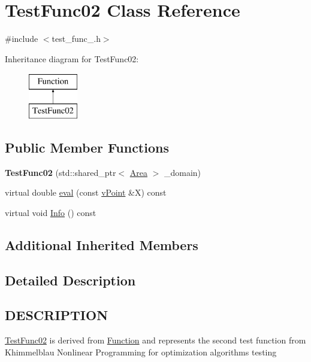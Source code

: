 \hypertarget{class_test_func02}{}\section{Test\+Func02 Class Reference}
\label{class_test_func02}


{\ttfamily \#include $<$test\+\_\+func\+\_.\+h$>$}

Inheritance diagram for Test\+Func02\+:\begin{figure}[H]
\begin{center}
\leavevmode
\includegraphics[height=2.000000cm]{class_test_func02}
\end{center}
\end{figure}
\subsection*{Public Member Functions}
\begin{DoxyCompactItemize}
\item 
\mbox{\label{class_test_func02_aeb12e0d6d3c926c2074247773e44f894}} 
{\bfseries Test\+Func02} (std\+::shared\+\_\+ptr$<$ \hyperlink{class_area}{Area} $>$ \+\_\+domain)
\item 
virtual double \hyperlink{class_test_func02_af4cbebcbe8a7bd282f48ae7053c044b0}{eval} (const \hyperlink{classv_point}{v\+Point} \&X) const
\item 
virtual void \hyperlink{class_test_func02_abb39a10959e945371e662db3cd9d86ce}{Info} () const
\end{DoxyCompactItemize}
\subsection*{Additional Inherited Members}


\subsection{Detailed Description}
\hypertarget{function_8h_DESCRIPTION}{}\subsection{D\+E\+S\+C\+R\+I\+P\+T\+I\+ON}\label{function_8h_DESCRIPTION}
\hyperlink{class_test_func02}{Test\+Func02} is derived from \hyperlink{class_function}{Function} and represents the second test function from Khimmelblau \textquotesingle{}Nonlinear Programming\textquotesingle{} for optimization algorithms testing 

